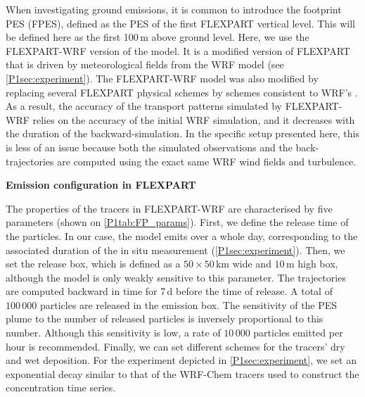         When investigating ground emissions, it is common to introduce the footprint PES (FPES), defined as the PES of the first FLEXPART vertical level. This will be defined here as the first 100\,\unit{m} above ground level.
        Here, we use the FLEXPART-WRF version of the model. It is a modified version of FLEXPART that is driven by meteorological fields from the WRF model (see \cref{P1sec:experiment}). The FLEXPART-WRF model was also modified by replacing several FLEXPART physical schemes by schemes consistent to WRF's \citep{brioude_lagrangian_2013}.
        As a result, the accuracy of the transport patterns simulated by FLEXPART-WRF relies on the accuracy of the initial WRF simulation, and it decreases with the duration of the backward-simulation.
        In the specific setup presented here, this is less of an issue because both the simulated observations and the back-trajectories are computed using the exact same WRF wind fields and turbulence.

        \vspace{\baselineskip}
        \textbf{Emission configuration in FLEXPART}

            The properties of the tracers in FLEXPART-WRF are characterised by five parameters (shown on \cref{P1tab:FP_params}).
            First, we define the release time of the particles. In our case, the model emits over a whole day, corresponding to the associated duration of the in situ measurement (\cref{P1sec:experiment}).
            Then, we set the release box, which is defined as a $50\times 50$\,\unit{km} wide and $10$\,\unit{m} high box, although the model is only weakly sensitive to this parameter. The trajectories are computed backward in time for 7\,d before the time of release.
            A total of $100\,000$ particles are released in the emission box.
            The sensitivity of the PES plume to the number of released particles is inversely proportional to this number.
            Although this sensitivity is low, a rate of $10\,000$ particles emitted per hour is recommended.
            Finally, we can set different schemes for the tracers' dry and wet deposition.
            For the experiment depicted in \cref{P1sec:experiment}, we set an exponential decay similar to that of the WRF-Chem tracers used to construct the concentration time series.

